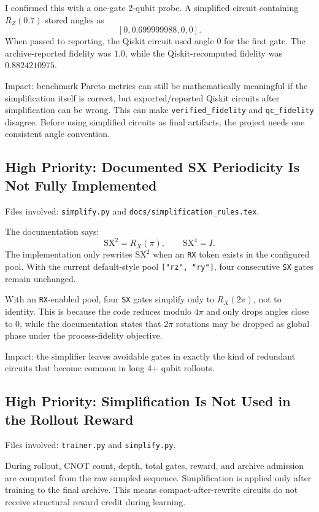 \documentclass[11pt]{article}
\begin{document}
I confirmed this with a one-gate 2-qubit probe.  A simplified circuit containing
\(R_Z(0.7)\) stored angles as
\[
  [0, 0.699999988, 0, 0].
\]
When passed to reporting, the Qiskit circuit used angle \(0\) for the first gate.
The archive-reported fidelity was \(1.0\), while the Qiskit-recomputed fidelity
was \(0.8824210975\).

Impact: benchmark Pareto metrics can still be mathematically meaningful if the
simplification itself is correct, but exported/reported Qiskit circuits after
simplification can be wrong.  This can make \texttt{verified\_fidelity} and
\texttt{qc\_fidelity} disagree.  Before using simplified circuits as final
artifacts, the project needs one consistent angle convention.

\subsection{High Priority: Documented SX Periodicity Is Not Fully Implemented}

Files involved: \texttt{simplify.py} and \texttt{docs/simplification\_rules.tex}.

The documentation says:
\[
  \mathrm{SX}^2 = R_X(\pi), \qquad \mathrm{SX}^4 = I.
\]
The implementation only rewrites \(\mathrm{SX}^2\) when an \texttt{RX} token
exists in the configured pool.  With the current default-style pool
\texttt{["rz", "ry"]}, four consecutive \texttt{SX} gates remain unchanged.

With an \texttt{RX}-enabled pool, four \texttt{SX} gates simplify only to
\(R_X(2\pi)\), not to identity.  This is because the code reduces modulo
\(4\pi\) and only drops angles close to \(0\), while the documentation states
that \(2\pi\) rotations may be dropped as global phase under the process-fidelity
objective.

Impact: the simplifier leaves avoidable gates in exactly the kind of redundant
circuits that become common in long 4+ qubit rollouts.

\subsection{High Priority: Simplification Is Not Used in the Rollout Reward}

Files involved: \texttt{trainer.py} and \texttt{simplify.py}.

During rollout, CNOT count, depth, total gates, reward, and archive admission are
computed from the raw sampled sequence.  Simplification is applied only after
training to the final archive.  This means compact-after-rewrite circuits do not
receive structural reward credit during learning.
\end{document}
